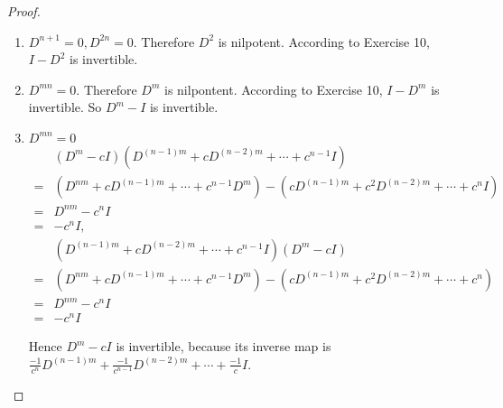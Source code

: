 \begin{proof}
    \begin{enumerate}[label={(\alph*)}]
        \item $D^{n+1} = 0, D^{2n} = 0$. Therefore $D^{2}$ is nilpotent. According to Exercise 10, $I - D^{2}$ is invertible.
        \item $D^{mn} = 0$. Therefore $D^{m}$ is nilpontent. According to Exercise 10, $I - D^{m}$ is invertible. So $D^{m} - I$ is invertible.
        \item $D^{mn} = 0$
              \begin{align*}
                    & (D^{m} - cI)(D^{(n-1)m} + cD^{(n-2)m} + \cdots + c^{n-1}I)                                         \\
                  = & (D^{nm} + cD^{(n-1)m} + \cdots + c^{n-1}D^{m}) - (cD^{(n-1)m} + c^{2}D^{(n-2)m} + \cdots + c^{n}I) \\
                  = & D^{nm} - c^{n}I                                                                                    \\
                  = & -c^{n}I,                                                                                           \\
                    & (D^{(n-1)m} + cD^{(n-2)m} + \cdots + c^{n-1}I)(D^{m} - cI)                                         \\
                  = & (D^{nm} + cD^{(n-1)m} + \cdots + c^{n-1}D^{m}) - (cD^{(n-1)m} + c^{2}D^{(n-2)m} + \cdots + c^{n})  \\
                  = & D^{nm} - c^{n}I                                                                                    \\
                  = & -c^{n}I
              \end{align*}

              Hence $D^{m} - cI$ is invertible, because its inverse map is $\frac{-1}{c^{n}}D^{(n-1)m} + \frac{-1}{c^{n-1}}D^{(n-2)m} + \cdots + \frac{-1}{c}I$.
    \end{enumerate}
\end{proof}

